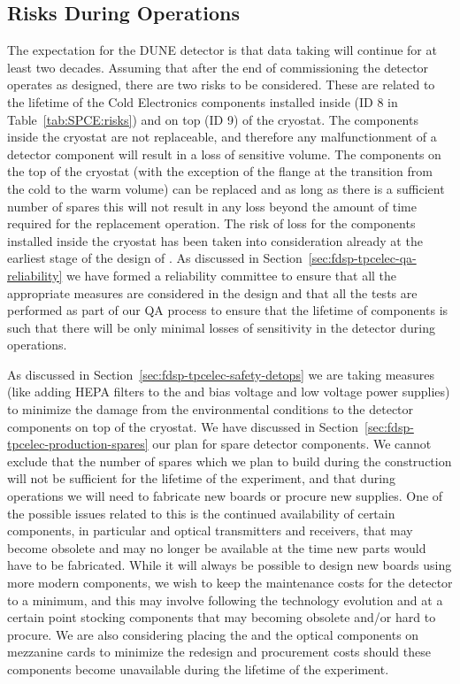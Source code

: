 \subsection{Risks During Operations}
\label{sec:fdsp-tpcelec-risks-operations}

The expectation for the DUNE detector is that data taking will continue
for at least two decades. Assuming that after the end of commissioning the
detector operates as designed, there are two risks to be considered.
These are related to the lifetime of the Cold Electronics components
installed inside (ID 8 in Table~\ref{tab:SPCE:risks}) and on top (ID 9)
of the cryostat. The components inside the cryostat are not replaceable,
and therefore any malfunctionment of a detector component will result in
a loss of sensitive volume. The components on the top of the cryostat
(with the exception of the flange at the transition from the cold to
the warm volume) can be replaced and as long as there is a sufficient
number of spares this will not result in any loss beyond the amount 
of time required for the replacement operation. The risk of loss for
the components installed inside the cryostat has been taken into consideration
already at the earliest stage of the design of . As discussed
in Section~\ref{sec:fdsp-tpcelec-qa-reliability} we have formed a 
reliability committee to ensure that all the appropriate measures
are considered in the design and that all the tests are performed
as part of our QA process to ensure that the lifetime of components is
such that there will be only minimal losses of sensitivity in the 
detector during operations. 

As discussed in Section~\ref{sec:fdsp-tpcelec-safety-detops} we
are taking measures (like adding HEPA filters to the
 and bias voltage and low voltage power supplies) to
minimize the damage from the environmental conditions to the 
detector components on top of the cryostat. We have discussed in
Section~\ref{sec:fdsp-tpcelec-production-spares} our plan for 
spare detector components. We cannot exclude that the number of
spares which we plan to build during the construction will not be
sufficient for the lifetime of the experiment, and that during 
operations we will need to fabricate new boards or procure new
supplies. One of the possible issues related to this is the 
continued availability of certain components, in particular
 and optical transmitters and receivers, that may 
become obsolete and may no longer be available at the time new
parts would have to be fabricated. While it will always be 
possible to design new boards using more modern components, we
wish to keep the maintenance costs for the detector to a minimum,
and this may involve following the technology evolution and at
a certain point stocking components that may becoming obsolete
and/or hard to procure. We are also considering placing the
 and the optical components on mezzanine cards
to minimize the redesign and procurement costs should these 
components become unavailable during the lifetime of the experiment.
